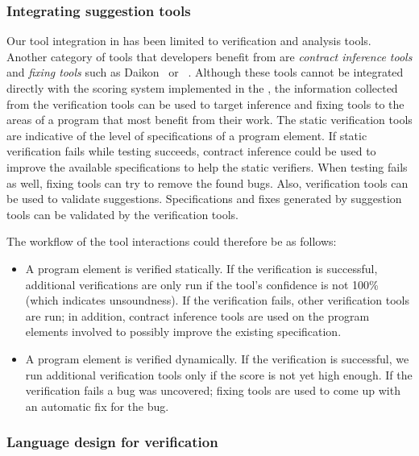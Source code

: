 \subsubsection{Integrating suggestion tools}

Our tool integration in \EVE has been limited to verification and analysis tools. Another category of tools that developers benefit from are \emph{contract inference tools} and \emph{fixing tools} such as Daikon~\cite{ERNST07} or \AutoFix~\cite{PEI11,PEI14}. Although these tools cannot be integrated directly with the scoring system implemented in the \VAssist, the information collected from the verification tools can be used to target inference and fixing tools to the areas of a program that most benefit from their work. The static verification tools are indicative of the level of specifications of a program element. If static verification fails while testing succeeds, contract inference could be used to improve the available specifications to help the static verifiers. When testing fails as well, fixing tools can try to remove the found bugs. Also, verification tools can be used to validate suggestions. Specifications and fixes generated by suggestion tools can be validated by the verification tools.

The workflow of the tool interactions could therefore be as follows:
\begin{itemize}
\item
A program element is verified statically. If the verification is successful, additional verifications are only run if the tool's confidence is not 100\% (which indicates unsoundness). If the verification fails, other verification tools are run; in addition, contract inference tools are used on the program elements involved to possibly improve the existing specification.

\item
A program element is verified dynamically. If the verification is successful, we run additional verification tools only if the score is not yet high enough.
If the verification fails a bug was uncovered; fixing tools are used to come up with an automatic fix for the bug.

\end{itemize}


\subsubsection{Language design for verification}

